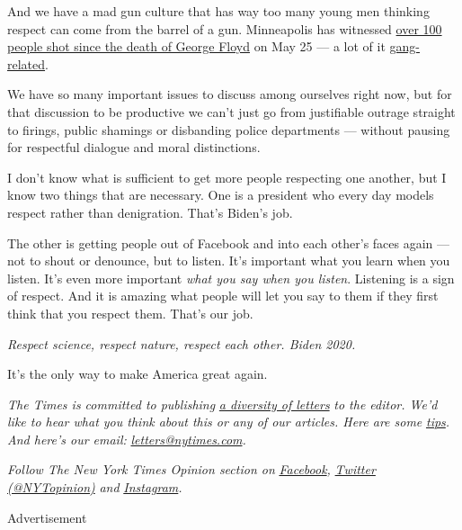 And we have a mad gun culture that has way too many young men thinking
respect can come from the barrel of a gun. Minneapolis has witnessed
\href{https://www.startribune.com/a-month-after-floyd-s-death-city-struggles-with-twin-crises/571496482/?refresh=true}{over
100 people shot since the death of George Floyd} on May 25 --- a lot of
it
\href{https://www.kare11.com/article/news/health/coronavirus/minneapolis-dealing-with-multiple-crises/89-125767bb-f565-481a-9d50-a2636ddf309b}{gang-related}.

We have so many important issues to discuss among ourselves right now,
but for that discussion to be productive we can't just go from
justifiable outrage straight to firings, public shamings or disbanding
police departments --- without pausing for respectful dialogue and moral
distinctions.

I don't know what is sufficient to get more people respecting one
another, but I know two things that are necessary. One is a president
who every day models respect rather than denigration. That's Biden's
job.

The other is getting people out of Facebook and into each other's faces
again --- not to shout or denounce, but to listen. It's important what
you learn when you listen. It's even more important \emph{what you say
when you listen}. Listening is a sign of respect. And it is amazing what
people will let you say to them if they first think that you respect
them. That's our job.

\emph{Respect science, respect nature, respect each other. Biden 2020.}

It's the only way to make America great again.

\emph{The Times is committed to publishing}
\href{https://www.nytimes.com/2019/01/31/opinion/letters/letters-to-editor-new-york-times-women.html}{\emph{a
diversity of letters}} \emph{to the editor. We'd like to hear what you
think about this or any of our articles. Here are some}
\href{https://help.nytimes.com/hc/en-us/articles/115014925288-How-to-submit-a-letter-to-the-editor}{\emph{tips}}\emph{.
And here's our email:}
\href{mailto:letters@nytimes.com}{\emph{letters@nytimes.com}}\emph{.}

\emph{Follow The New York Times Opinion section on}
\href{https://www.facebook.com/nytopinion}{\emph{Facebook}}\emph{,}
\href{http://twitter.com/NYTOpinion}{\emph{Twitter (@NYTopinion)}}
\emph{and}
\href{https://www.instagram.com/nytopinion/}{\emph{Instagram}}\emph{.}

Advertisement

